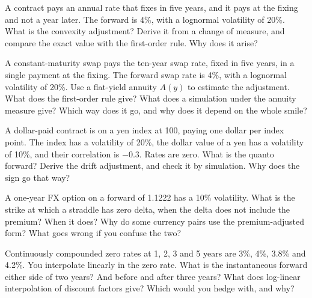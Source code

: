 \begin{question}\label{iq:iv2:rates-and-fx:41}
A contract pays an annual rate that fixes in five years, and it pays at the fixing and not a year later. The forward is 4\%, with a lognormal volatility of 20\%. What is the convexity adjustment? Derive it from a change of measure, and compare the exact value with the first-order rule. Why does it arise?
\end{question}

\begin{question}\label{iq:iv2:rates-and-fx:42}
A constant-maturity swap pays the ten-year swap rate, fixed in five years, in a single payment at the fixing. The forward swap rate is 4\%, with a lognormal volatility of 20\%. Use a flat-yield annuity $A(y)$ to estimate the adjustment. What does the first-order rule give? What does a simulation under the annuity measure give? Which way does it go, and why does it depend on the whole smile?
\end{question}

\begin{question}\label{iq:iv2:rates-and-fx:43}
A dollar-paid contract is on a yen index at 100, paying one dollar per index point. The index has a volatility of 20\%, the dollar value of a yen has a volatility of 10\%, and their correlation is $-0.3$. Rates are zero. What is the quanto forward? Derive the drift adjustment, and check it by simulation. Why does the sign go that way?
\end{question}

\begin{question}\label{iq:iv2:rates-and-fx:44}
A one-year FX option on a forward of 1.1222 has a 10\% volatility. What is the strike at which a straddle has zero delta, when the delta does not include the premium? When it does? Why do some currency pairs use the premium-adjusted form? What goes wrong if you confuse the two?
\end{question}

\begin{question}\label{iq:iv2:rates-and-fx:45}
Continuously compounded zero rates at 1, 2, 3 and 5 years are 3\%, 4\%, 3.8\% and 4.2\%. You interpolate linearly in the zero rate. What is the instantaneous forward either side of two years? And before and after three years? What does log-linear interpolation of discount factors give? Which would you hedge with, and why?
\end{question}

